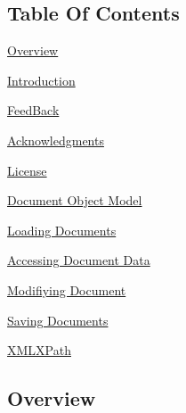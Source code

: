 \hypertarget{XMLManual_XMLTOC}{}\subsection{Table Of Contents}\label{XMLManual_XMLTOC}

\begin{DoxyItemize}
\item \hyperlink{XMLManual_XMLOverview}{Overview}
\begin{DoxyItemize}
\item \hyperlink{XMLManual_XMLIntroduction}{Introduction}
\item \hyperlink{XMLManual_XMLFeedBack}{FeedBack}
\item \hyperlink{XMLManual_XMLAcknowledgments}{Acknowledgments}
\item \hyperlink{XMLManual_XMLLicense}{License}
\end{DoxyItemize}
\item \hyperlink{XMLManual_XMLDOM}{Document Object Model}
\item \hyperlink{XMLManual_XMLLoading}{Loading Documents}
\item \hyperlink{XMLManual_XMLAccessing}{Accessing Document Data}
\item \hyperlink{XMLManual_XMLModifying}{Modifiying Document}
\item \hyperlink{XMLManual_XMLSaving}{Saving Documents}
\item \hyperlink{XMLManual_XMLXPath}{XMLXPath} \par
 \par
 
\end{DoxyItemize}\hypertarget{XMLManual_XMLOverview}{}\subsection{Overview}\label{XMLManual_XMLOverview}

